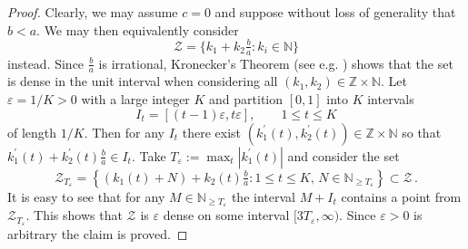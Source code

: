 \documentclass[10pt]{amsart}
\theoremstyle{definition}
\newcommand{\Z}{\mathbb{Z}}
\newcommand{\N}{\mathbb{N}}
\begin{document}
\begin{proof}
	Clearly, we may assume $c=0$ and suppose without loss of generality that $b<a$. We may then equivalently 
	consider 
 \begin{equation*}
     \mathcal{Z}=\{ k_1+k_2\tfrac{b}{a}: k_i\in\mathbb{N} \}
 \end{equation*}
 instead. Since $\tfrac{b}{a}$ is irrational,	Kronecker's Theorem (see e.g. \cite[Section 3.5 Theorem IV]{Cassels}) shows that the set is dense in the unit interval when considering all
	$(k_1, k_2)\in \Z\times \N$. Let $\varepsilon=1/K>0$ with a large integer $K$ and partition $[0,1]$ into $K$ intervals
 \begin{equation*}
 I_t=[(t-1)\varepsilon,t\varepsilon], \qquad 1\le t\le K   
 \end{equation*}
 of length $1/K$. Then for any $I_t$ there exist
	 $(k_1^{\prime}(t), k_2^{\prime}(t))\in\Z\times\N$ so that $k_1^{\prime}(t)+k_2^{\prime}(t)\tfrac{b}{a}\in I_t$. Take
	$T_{\varepsilon}:= \max_t |k_1^{\prime}(t)|$ and consider the set 
 \begin{equation*}
 \mathcal{Z}_{T_{\varepsilon}} = \left\{ (k_{1}(t)+N) + k_{2}(t)\tfrac{b}{a} : 1\leq t\leq K, \, N \in \N_{\geq T_{\varepsilon}} \right\} \subset \mathcal{Z}\, .
\end{equation*}
	It is easy to see that for any $M\in\N_{\geq T_{\varepsilon}}$ the interval $M+I_{t}$ contains a point from $\mathcal{Z}_{T_{\varepsilon}}$.
	This shows that $\mathcal{Z}$ is $\varepsilon$ dense on some interval $[3T_{\varepsilon},\infty)$. Since $\varepsilon>0$ 
	is arbitrary the claim is proved.
	\end{proof}



\end{document}
